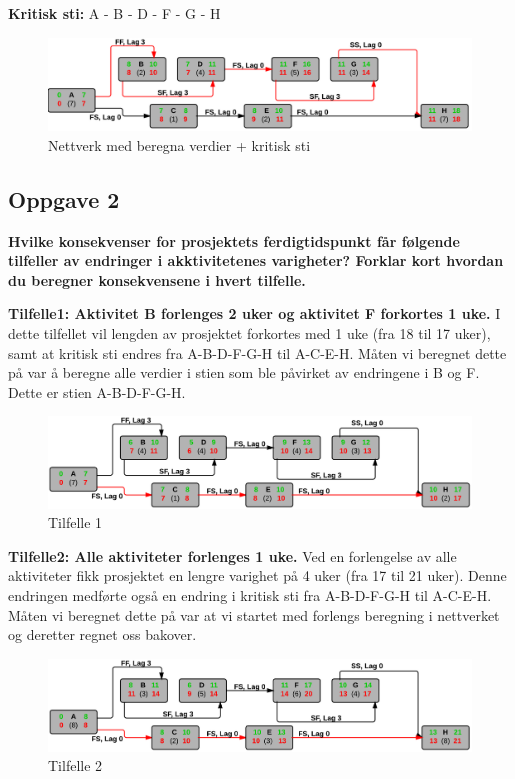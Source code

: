		{\bf Kritisk sti:} A - B - D - F - G - H

		\begin{figure}[H]
			\includegraphics[width=\textwidth]{task1.png}
			\caption{Nettverk med beregna verdier + kritisk sti}
		\end{figure}

		
	\clearpage
	\subsection*{Oppgave 2}
		{\bf Hvilke konsekvenser for prosjektets ferdigtidspunkt får følgende tilfeller av endringer i akktivitetenes varigheter? Forklar kort hvordan du beregner konsekvensene i hvert tilfelle.}

		{\bf Tilfelle1: Aktivitet B forlenges 2 uker og aktivitet F forkortes 1 uke.}
		I dette tilfellet vil lengden av  prosjektet forkortes med 1 uke (fra 18 til 17 uker),
		samt at kritisk sti endres fra A-B-D-F-G-H til A-C-E-H. Måten vi beregnet dette på var
		å beregne alle verdier i stien som ble påvirket av endringene i B og F. Dette er stien
		A-B-D-F-G-H.

		\begin{figure}[H]
			\includegraphics[width=\textwidth]{task2-1.png}
			\caption{Tilfelle 1}
		\end{figure}

		{\bf Tilfelle2: Alle aktiviteter forlenges 1 uke.}
		Ved en forlengelse av alle aktiviteter fikk prosjektet en lengre varighet på 4 uker 
		(fra 17 til 21 uker). Denne endringen medførte også en endring i kritisk sti fra 
		A-B-D-F-G-H til A-C-E-H. Måten vi beregnet dette på var at vi startet med forlengs beregning
		i nettverket og deretter regnet oss bakover. 

		\begin{figure}[H]
			\includegraphics[width=\textwidth]{task2-2.png}
			\caption{Tilfelle 2}
		\end{figure}

